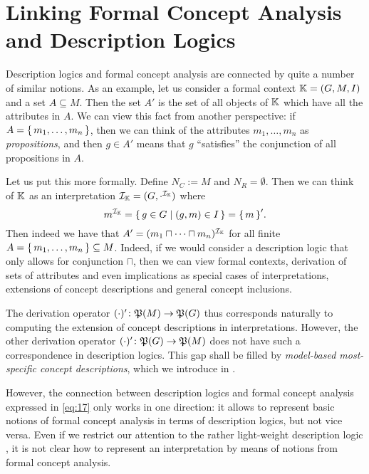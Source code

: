 \section{Linking Formal Concept Analysis and Description Logics}
\label{sec:motivation}

Description logics and formal concept analysis are connected by quite a number of similar
notions.  As an example, let us consider a formal context ${\mathbb{K}} = (G, M, I)$ and a set
$A \subseteq M$.  Then the set $A'$ is the set of all objects of ${\mathbb{K}}$ which have all
the attributes in $A$.  We can view this fact from another perspective: if $A = {\{\, m_1,
  \dots, m_n \,\}}$, then we can think of the attributes $m_1, \dots, m_n$ as
\emph{propositions}, and then $g \in A'$ means that $g$ ``satisfies'' the conjunction of
all propositions in $A$.

Let us put this more formally.  Define $N_C := M$ and $N_R = \emptyset$.  Then we can
think of ${\mathbb{K}}$ as an interpretation $\mathcal{I}_{{\mathbb{K}}} = (G,
\cdot^{\mathcal{I}_{{\mathbb{K}}}})$ where
\begin{equation}
  \label{eq:17}
  m^{\mathcal{I}_{{\mathbb{K}}}} = {\{\, g \in G \mid (g, m) \in I \,\}} = {\{\, m \,\}}'.
\end{equation}
Then indeed we have that $A' = (m_1 \sqcap \dots \sqcap m_n)^{\mathcal{I}_{{\mathbb{K}}}}$ for
all finite $A = {\{\, m_1, \dots, m_n \,\}} \subseteq M$.  Indeed, if we would consider a
description logic that only allows for conjunction $\sqcap$, then we can view formal
contexts, derivation of sets of attributes and even implications as special cases of
interpretations, extensions of concept descriptions and general concept inclusions.

The derivation operator $(\cdot)' \colon {\ensuremath{\mathfrak{P}(M)}} \to {\ensuremath{\mathfrak{P}(G)}}$ thus corresponds
naturally to computing the extension of concept descriptions in interpretations.  However,
the other derivation operator $(\cdot)' \colon {\ensuremath{\mathfrak{P}(G)}} \to {\ensuremath{\mathfrak{P}(M)}}$ does not have
such a correspondence in description logics.  This gap shall be filled by
\emph{model-based most-specific concept descriptions}, which we introduce in
.

However, the connection between description logics and formal concept analysis expressed
in \eqref{eq:17} only works in one direction: it allows to represent basic notions of
formal concept analysis in terms of description logics, but not vice versa.  Even if we
restrict our attention to the rather light-weight description logic \ELbot, it is not
clear how to represent an interpretation by means of notions from formal concept analysis.

